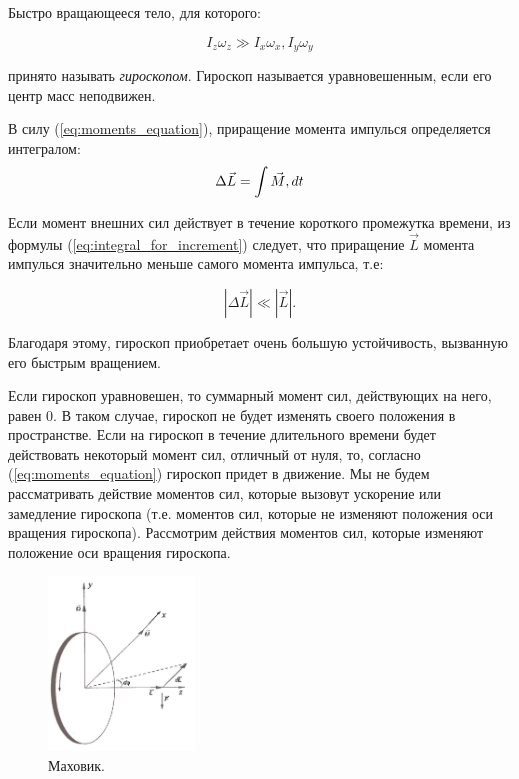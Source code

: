 \documentclass[12pt,a4paper]{article}
\begin{document}
Быстро вращающееся тело, для которого:

	$$I_{z}\omega_{z} \gg I_{x}\omega_{x}, I_{y}\omega_{y}$$

принято называть \textit{гироскопом}. Гироскоп называется уравновешенным, если его центр масс неподвижен.

В силу (\ref{eq:moments_equation}), приращение момента импулься определяется интегралом:
\begin{equation}
	\Delta\vec{L} =  \int\vec{M}\\,dt
	\label{eq:integral_for_increment}
\end{equation}

Если момент внешних сил действует в течение короткого промежутка времени, из формулы (\ref{eq:integral_for_increment}) следует, что приращение $\vec{L}$ момента импулься значительно меньше самого момента импульса, т.е:

\begin{equation}
	\left| \Delta\vec{L} \right| \ll \left| \vec{L} \right|.
\end{equation}

Благодаря этому, гироскоп приобретает очень большую устойчивость, вызванную его быстрым вращением.

Если гироскоп уравновешен, то суммарный момент сил, действующих на него, равен 0. В таком случае, гироскоп не будет изменять своего положения в пространстве. Если на гироскоп в течение длительного времени будет действовать некоторый момент сил, отличный от нуля, то, согласно (\ref{eq:moments_equation}) гироскоп придет в движение. Мы не будем рассматривать действие моментов сил, которые вызовут ускорение или замедление гироскопа (т.е. моментов сил, которые не изменяют положения оси вращения гироскопа). Рассмотрим действия моментов сил, которые изменяют положение оси вращения гироскопа.

\begin{figure}
	\vspace{-2.5ex}
	\includegraphics[width = 0.35\textwidth]{flywheel}
	\caption{Маховик.}
	\label{fig:flywheel}
\end{figure}
\end{document}
